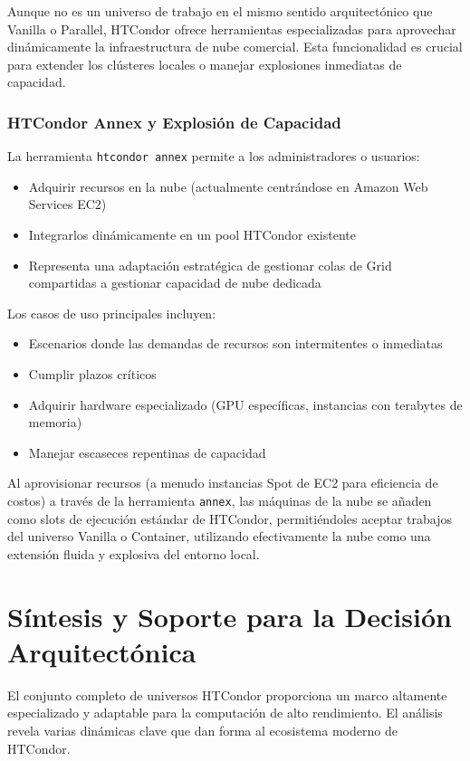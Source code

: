 Aunque no es un universo de trabajo en el mismo sentido arquitectónico que Vanilla o Parallel, HTCondor ofrece herramientas especializadas para aprovechar dinámicamente la infraestructura de nube comercial. Esta funcionalidad es crucial para extender los clústeres locales o manejar explosiones inmediatas de capacidad.

\subsubsection{HTCondor Annex y Explosión de Capacidad}

La herramienta \texttt{htcondor annex} permite a los administradores o usuarios:

\begin{itemize}
	\item Adquirir recursos en la nube (actualmente centrándose en Amazon Web Services EC2)
	\item Integrarlos dinámicamente en un pool HTCondor existente
	\item Representa una adaptación estratégica de gestionar colas de Grid compartidas a gestionar capacidad de nube dedicada
\end{itemize}

Los casos de uso principales incluyen:

\begin{itemize}
	\item Escenarios donde las demandas de recursos son intermitentes o inmediatas
	\item Cumplir plazos críticos
	\item Adquirir hardware especializado (GPU específicas, instancias con terabytes de memoria)
	\item Manejar escaseces repentinas de capacidad
\end{itemize}

Al aprovisionar recursos (a menudo instancias Spot de EC2 para eficiencia de costos) a través de la herramienta \texttt{annex}, las máquinas de la nube se añaden como slots de ejecución estándar de HTCondor, permitiéndoles aceptar trabajos del universo Vanilla o Container, utilizando efectivamente la nube como una extensión fluida y explosiva del entorno local.

\section{Síntesis y Soporte para la Decisión Arquitectónica}

El conjunto completo de universos HTCondor proporciona un marco altamente especializado y adaptable para la computación de alto rendimiento. El análisis revela varias dinámicas clave que dan forma al ecosistema moderno de HTCondor.

